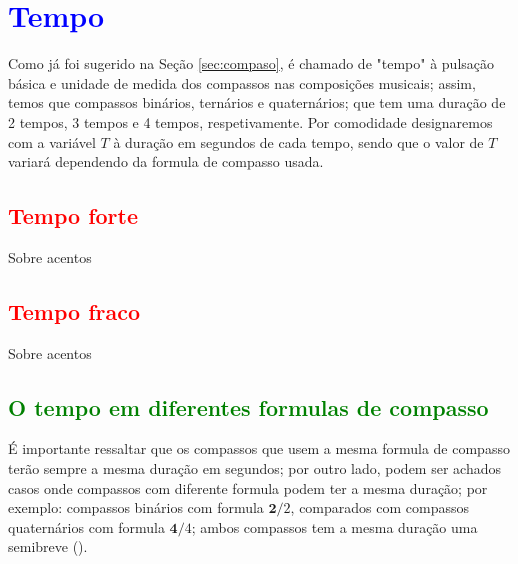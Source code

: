 \section{\textcolor{blue}{Tempo}}

Como já foi sugerido na Seção \ref{sec:compaso}, é chamado de "tempo" 
à pulsação básica e unidade de medida dos compassos nas composições musicais;
assim, temos que compassos binários, ternários e quaternários; que tem uma duração de 2 tempos, 
3 tempos e 4 tempos, respetivamente. Por comodidade designaremos com a variável $T$ à duração em segundos de cada tempo,
sendo que o valor de $T$ variará dependendo da formula de compasso usada.

\subsection{\textcolor{red}{Tempo forte}}

Sobre acentos  \cite[pp. 9]{phillips2002sight}

\subsection{\textcolor{red}{Tempo fraco}}

Sobre acentos  \cite[pp. 9]{phillips2002sight}



\subsection{\textcolor{green}{O tempo em diferentes formulas de compasso}}
É importante ressaltar que os compassos que usem a mesma formula de compasso terão sempre a mesma duração em segundos;
por outro lado, podem ser achados casos onde compassos com diferente formula podem ter a mesma duração;
por exemplo: compassos binários com formula $\mathbf{2}/2$, comparados com compassos quaternários com 
formula $\mathbf{4}/4$; ambos compassos tem a mesma duração uma semibreve (\fullnote).

